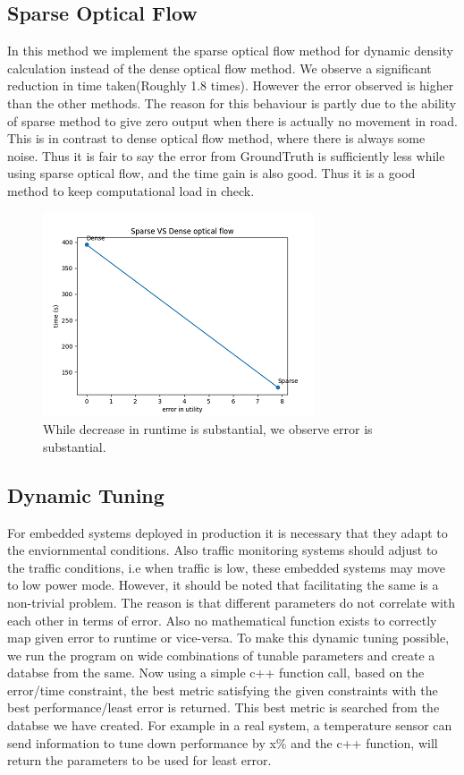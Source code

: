 \documentclass[conference]{IEEEtran}
\begin{document}
\subsection{Sparse Optical Flow}

In this method we implement the sparse optical flow method for dynamic density calculation instead of the dense optical flow method.
We observe a significant reduction in time taken(Roughly 1.8 times). However the error observed is higher than the other methods.
The reason for this behaviour is partly due to the ability of sparse method to give zero output when there is actually no movement in road. This is in contrast to dense optical flow method,
where there is always some noise. Thus it is fair to say the error from GroundTruth is sufficiently less while using sparse optical flow, and the time gain is also good. Thus it is a good method to keep computational load in check.

\begin{figure}[htbp]
\centerline{\includegraphics{plots/plot_sparse_optical.png}}
\caption{While decrease in runtime is substantial, we observe error is substantial.}
\label{sof_pvt} 
\end{figure}

\subsection{Dynamic Tuning}

For embedded systems deployed in production it is necessary that they adapt to the enviornmental conditions. Also traffic monitoring systems should adjust to the traffic conditions,
i.e when traffic is low, these embedded systems may move to low power mode. 
However, it should be noted that facilitating the same is a non-trivial problem. The reason is that different parameters do not correlate with each other in terms of error. Also no mathematical function exists to correctly map given error to runtime or vice-versa.
To make this dynamic tuning possible, we run the program on wide combinations of tunable parameters and create a databse from the same.
Now using a simple c++ function call, based on the error/time constraint, the best metric satisfying the given constraints with the best performance/least error is returned. This best metric is searched from the databse we have created. For example in a real system, a temperature sensor can send information to tune down performance by x\% and 
the c++ function, will return the parameters to be used for least error.
\end{document}
